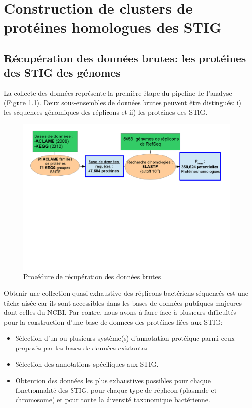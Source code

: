 \chapter{Construction de clusters de protéines homologues des STIG}\label{chap3b}

   
\section{Récupération des données brutes: les protéines des STIG des génomes}\label{pardonnebrut}
	La collecte des données représente la première étape du pipeline de l'analyse (Figure \ref{figstep1}). Deux sous-ensembles de données brutes peuvent être distingués: i) les séquences génomiques des réplicons et ii) les protéines des STIG.

\begin{figure}[H]
	\includegraphics[width=\textwidth, trim= 0cm 12cm 0cm 0cm ,clip]{./img/workflow_sub1.png}
	\caption{Procédure de récupération des données brutes}\label{figstep1}
\end{figure}  

Obtenir une collection quasi-exhaustive des réplicons bactériens séquencés est une tâche aisée car ils sont accessibles dans les bases de données publiques majeures dont celles du NCBI. Par contre, nous avons à faire face à plusieurs difficultés pour la construction d'une base de données des protéines liées aux STIG:
\begin{itemize}
	\item Sélection d'un ou plusieurs système(s) d'annotation protéique parmi ceux proposés par les bases de données existantes.
	\item Sélection des annotations spécifiques aux STIG.
	\item Obtention des données les plus exhaustives possibles pour chaque fonctionnalité des STIG, pour chaque type de réplicon (plasmide et chromosome) et pour toute la diversité taxonomique bactérienne.
\end{itemize}

